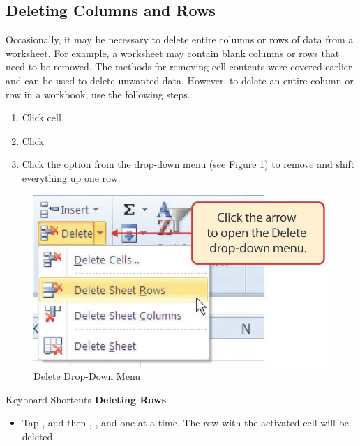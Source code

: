 \subsection{Deleting Columns and Rows}

Occasionally, it may be necessary to delete entire columns or rows of data from a worksheet. For example, a worksheet may contain blank columns or rows that need to be removed. The methods for removing cell contents were covered earlier and can be used to delete unwanted data. However, to delete an entire column or row in a workbook, use the following steps.

\begin{enumbox}
	\begin{enumerate}
		\item Click cell .
		\item Click 
		\item Click the  option from the drop-down menu (see Figure \ref{01:fig31}) to remove  and shift everything up one row.
	\end{enumerate}
\end{enumbox}
	
\begin{figure}[H]
	\centering
	\includegraphics[width=\maxwidth{.95\linewidth}]{gfx/ch01_fig31}
	\caption{Delete Drop-Down Menu}
	\label{01:fig31}
\end{figure}

\begin{center}
	\begin{shtcutbox}{Keyboard Shortcuts}
		\textbf{Deleting Rows}
		\\
		\begin{itemize}
			\setlength{\itemsep}{0pt}
			\setlength{\parskip}{0pt}
			\setlength{\parsep}{0pt}
			
			\item Tap , and then , , and  one at a time. The row with the activated cell will be deleted.
			
		\end{itemize}
	\end{shtcutbox}
\end{center}

